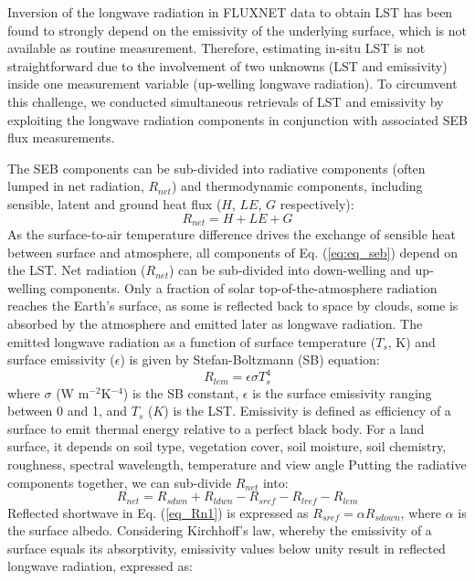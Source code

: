 \documentclass[fleqn,10pt]{wlscirep}
\begin{document}
  Inversion of the longwave radiation in FLUXNET data to obtain LST has been found to strongly depend on the emissivity of the underlying surface\cite{mallick2018bridging}, which is not available as routine measurement. Therefore, estimating in-situ LST is not straightforward due to the involvement of two unknowns (LST and emissivity) inside one measurement variable (up-welling longwave radiation). To circumvent this challenge, we conducted simultaneous retrievals of LST and emissivity by exploiting the longwave radiation components in conjunction with associated SEB flux measurements.

The SEB components can be sub-divided into radiative components (often lumped in net radiation, $R_{net}$) and thermodynamic components, including sensible, latent and ground heat flux ($H$, $LE$, $G$ respectively):
\begin{equation}\label{eq:eq_seb}
R_{net} = H + LE + G 
\end{equation}
As the surface-to-air temperature difference drives the exchange of sensible heat between surface and atmosphere, all components of Eq. (\ref{eq:eq_seb}) depend on the LST. Net radiation ($R_{net}$) can be sub-divided into down-welling and up-welling components. Only a fraction of solar top-of-the-atmosphere radiation reaches the Earth's surface, as some is reflected back to space by clouds, some is absorbed by the atmosphere and emitted later as longwave radiation. The emitted longwave radiation as a function of surface temperature ($T_s$, K) and surface emissivity ($\epsilon$) is given by Stefan-Boltzmann (SB) equation:
\begin{equation}\label{eq_Rlem}
R_{lem}= \epsilon \sigma T_{s}^{4}
\end{equation}
where $\sigma$ (W m$^{-2}$K$^{-4}$) is the SB constant, $\epsilon$ is the surface emissivity ranging between 0 and 1, and $T_{s}$ ($K$) is the LST.
Emissivity is defined as efficiency of a surface to emit thermal energy relative to a perfect black body. For a land surface, it depends on soil type, vegetation cover, soil moisture, soil chemistry, roughness, spectral wavelength, temperature and view angle\cite{norman1995terminology} 
Putting the radiative components together, we can sub-divide $R_{net}$ into:
\begin{equation}\label{eq_Rn1}
R_{net} = R_{sdwn} + R_{ldwn} - R_{sref} - R_{lref} - R_{lem}
\end{equation}
Reflected shortwave in Eq. ({\ref{eq_Rn1}}) is expressed as $R_{sref} = \alpha R_{sdown}$, where $\alpha$ is the surface albedo. Considering Kirchhoff's law, whereby the emissivity of a surface equals its absorptivity, emissivity values below unity result in reflected longwave radiation, expressed as:
\end{document}
